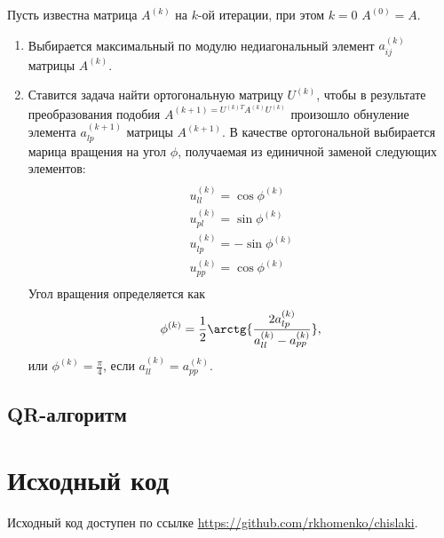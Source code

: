 \documentclass[a4paper,12pt]{article}
\begin{document}
Пусть известна матрица $A^{(k)}$ на $k$-ой итерации, при этом
$k = 0$ $A^{(0)} = A$.
\begin{enumerate}
    \item Выбирается максимальный по модулю недиагональный
    элемент $a_{ij}^{(k)}$ матрицы $A^{(k)}$.
    \item Ставится задача найти ортогональную матрицу $U^{(k)}$,
    чтобы в результате преобразования подобия
    $A^{(k + 1) = U^{(k) T} A^{(k)} U^{(k)}}$
    произошло обнуление элемента $a_{lp}^{(k + 1)}$
    матрицы $A^{(k + 1)}$. В качестве ортогональной выбирается
    марица вращения на угол $\phi$, получаемая из единичной
    заменой следующих элементов:
    \begin{multline}
    \\
    u^{(k)}_{ll} = \cos{\phi^{(k)}} \\
    u^{(k)}_{pl} = \sin{\phi^{(k)}} \\
    u^{(k)}_{lp} = -\sin{\phi^{(k)}} \\
    u^{(k)}_{pp} = \cos{\phi^{(k)}} \\
    \end{multline}
    Угол вращения определяется как
    $$
    \phi^{(k)} = \frac{1}{2}\arctg{\frac{2a_{lp}^{(k)}}{a_{ll}^{(k)} - a_{pp}^{(k)}}},
    $$
    или $\phi^{(k)} = \frac{\pi}{4}$, если $a_{ll}^{(k)} = a_{pp}^{(k)}$.

\end{enumerate}

\newpage

\subsection{QR-алгоритм}

\newpage

\section{Исходный код}
Исходный код доступен по ссылке
\url{https://github.com/rkhomenko/chislaki}.









\end{document}
